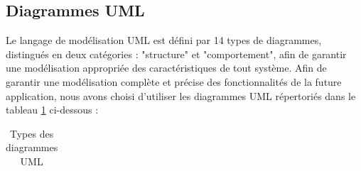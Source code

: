 \subsection{Diagrammes UML}
Le langage de modélisation \ac{UML} est défini par 14 types de diagrammes, distingués en deux catégories : "structure" et "comportement", afin de garantir une modélisation appropriée des caractéristiques de tout système.
Afin de garantir une modélisation complète et précise des fonctionnalités de la future application, nous avons choisi d'utiliser les diagrammes UML répertoriés dans le tableau \ref{tab:diagUmlTab} ci-dessous :

\begin{longtable}[c]{|p{}|p{}|}
  \caption{Types des diagrammes UML}
  \label{tab:diagUmlTab}                                                                                                                                                                                                                                                                                                                                                                                                                               \\


\end{longtable}
